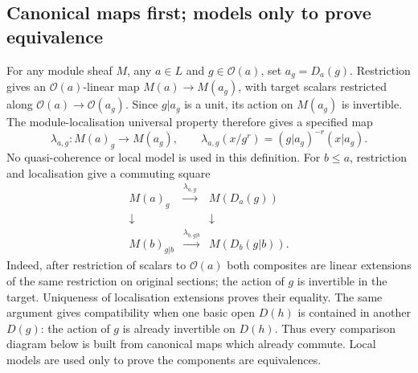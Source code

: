\documentclass[11pt]{amsart}
\theoremstyle{definition}\newtheorem{definition}[theorem]{Definition}
\theoremstyle{remark}\newtheorem{remark}[theorem]{Remark}
\newcommand{\OO}{\mathcal O}
\begin{document}
\subsection*{Canonical maps first; models only to prove equivalence}
For any module sheaf $M$, any $a\in L$ and $g\in\OO(a)$, set
$a_g=D_a(g)$. Restriction gives an $\OO(a)$-linear map
$M(a)\to M(a_g)$, with target scalars restricted along
$\OO(a)\to\OO(a_g)$. Since $g|a_g$ is a unit, its action on
$M(a_g)$ is invertible. The module-localisation universal property
therefore gives a specified map
\begin{equation}\label{eq:canonical-module-localisation}
 \lambda_{a,g}:M(a)_g\longrightarrow M(a_g),\qquad
 \lambda_{a,g}(x/g^r)=(g|a_g)^{-r}(x|a_g).
\end{equation}
No quasi-coherence or local model is used in this definition.
For $b\le a$, restriction and localisation give a commuting square
\[
\begin{array}{ccc}
 M(a)_g&\xrightarrow{\lambda_{a,g}}&M(D_a(g))\\
 \downarrow&&\downarrow\\
 M(b)_{g|b}&\xrightarrow{\lambda_{b,g|b}}&M(D_b(g|b)).
\end{array}
\]
Indeed, after restriction of scalars to $\OO(a)$ both composites are
linear extensions of the same restriction on original sections; the
action of $g$ is invertible in the target. Uniqueness of localisation
extensions proves their equality. The same argument gives compatibility
when one basic open $D(h)$ is contained in another $D(g)$: the action
of $g$ is already invertible on $D(h)$. Thus every comparison diagram below
is built from canonical maps which already commute. Local models are
used only to prove the components are equivalences.
\end{document}
